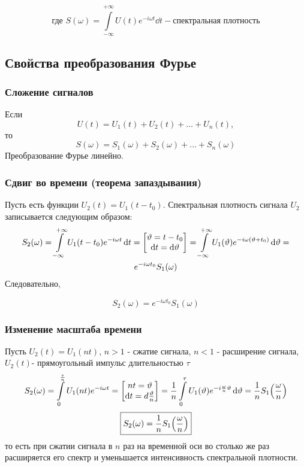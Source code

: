\documentclass[a4paper,14pt]{extarticle}
\gdef\newint{\int\limits_{-\infty}^{+\infty}}
\theoremstyle{definition}
\begin{document}
\begin{equation}
	\text{где } S(\omega)=\newint U(t)e^{-i \omega t}\dd{t} - \text{спектральная плотность} 
\end{equation}


\subsection{Свойства преобразования Фурье}
\subsubsection{Сложение сигналов}
Если 
\begin{equation}
	U(t)=U_1(t)+U_2(t)+\dots +U_n(t),
\end{equation}
то
\begin{equation}
	S(\omega)=S_1(\omega)+S_2(\omega)+\dots+S_n(\omega)
\end{equation}
Преобразование Фурье линейно.

\subsubsection{Сдвиг во времени (теорема запаздывания) }
Пусть есть функции $U_2(t)=U_1(t-t_0)$.
Спектральная плотность сигнала $U_2$ записывается следующим образом:
\begin{gather}
	S_2(\omega)=\newint U_1(t-t_0)e^{- i \omega t} \dd{t}=
	\mqty[\vartheta=t-t_0 \\ \dd{t}=\dd{\vartheta} ]=
	\newint U_1(\vartheta)e^{-i \omega (\vartheta +t_0)}\dd{\vartheta}=\\
	e^{-i \omega t_0} S_1(\omega)
\end{gather}
Следовательно,

\begin{equation}
	\boxed{	S_2(\omega)=e^{-i \omega t_0}S_1(\omega) } 
\end{equation}




\subsubsection{Изменение масштаба времени}
Пусть $U_2(t)=U_1(nt)$, $n>1$ - сжатие сигнала, $n<1$ - расширение сигнала, $U_2(t)$- прямоугольный импульс длительностью $\tau$
\begin{gather*}
	S_2(\omega)=
	\int\limits_0^{\frac{\tau}{n}}U_1(nt)e^{-i \omega t}=
	\mqty[nt=\vartheta \\ \dd{t}=d\frac{\vartheta}{n}]=
	\frac{1}{n}\int\limits_0^{\tau} 
		U_1(\vartheta) e^{-i\frac{\omega}{n} \vartheta} \dd{\vartheta}=
	\frac{1}{n} S_1 \qty(\frac{\omega}{n})
\end{gather*}
\begin{equation}
	\boxed 
	{
		S_2(\omega)=\frac{1}{n}S_1\qty(\frac{\omega}{n})
		}
\end{equation}
то есть при сжатии сигнала в $n$ раз на временной оси во столько же раз расширяется его спектр и уменьшается интенсивность спектральной плотности.
\end{document}
